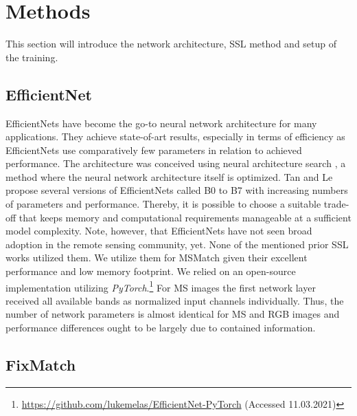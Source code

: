 \documentclass[journal]{IEEEtran}
\begin{document}
\section{Methods}
This section will introduce the network architecture, SSL method and setup of the training. 

\subsection{EfficientNet}
EfficientNets \cite{tan2019} have become the go-to neural network architecture for many applications. They achieve state-of-art results, especially in terms of efficiency as EfficientNets use comparatively few parameters in relation to achieved performance. The architecture was conceived using neural architecture search \cite{elsken2019neural}, a method where the neural network architecture itself is optimized. Tan and Le propose several versions of EfficientNets called B0 to B7 with increasing numbers of parameters and performance. Thereby, it is possible to choose a suitable trade-off that keeps memory and computational requirements manageable at a sufficient model complexity.
Note, however, that EfficientNets have not seen broad adoption in the remote sensing community, yet. None of the mentioned prior SSL works utilized them. We utilize them for MSMatch given their excellent performance and low memory footprint. We relied on an open-source implementation utilizing \textit{PyTorch}.\footnote{\url{https://github.com/lukemelas/EfficientNet-PyTorch} (Accessed 11.03.2021)}
For MS images the first network layer received all available bands as normalized input channels individually. Thus, the number of network parameters is almost identical for MS and RGB images and performance differences ought to be largely due to contained information.

\subsection{FixMatch}
\end{document}
